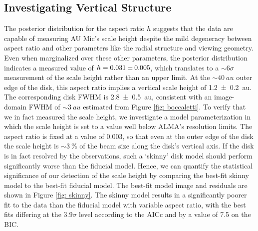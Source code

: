 \documentclass[modern]{aastex62}
\begin{document}
\subsection{Investigating Vertical Structure}
\label{subsection: vertical analysis}

The posterior distribution for the aspect ratio $h$ suggests that the data are capable of measuring AU Mic's scale height despite the mild degeneracy between aspect ratio and other parameters like the radial structure and viewing geometry.  
Even when marginalized over these other parameters, the posterior distribution indicates a measured value of $h=\num{0.031 \pm 0.005}$, which translates to a $\sim 6 \sigma$ measurement of the scale height rather than an upper limit.
At the $\sim \SI{40}{au}$ outer edge of the disk, this aspect ratio implies a vertical scale height of \SI{1.2 \pm 0.2}{au}. 
The corresponding disk FWHM is \SI{2.8 \pm 0.5}{au}, consistent with an image-domain FWHM of $\sim \SI{3}{au}$ estimated from Figure \ref{fig: boccaletti}.
To verify that we in fact measured the scale height, we investigate a model parameterization in which the scale height is set to a value well below ALMA's resolution limits.
The aspect ratio is fixed at a value of $0.003$, so that even at the outer edge of the disk the scale height is $\sim \SI{3}{\percent}$ of the beam size along the disk's vertical axis.
If the disk is in fact resolved by the observations, such a `skinny' disk model should perform significantly worse than the fiducial model.
Hence, we can quantify the statistical significance of our detection of the scale height by comparing the best-fit skinny model to the best-fit fiducial model.
The best-fit model image and residuals are shown in Figure \ref{fig: skinny}.
The skinny model results in a significantly poorer fit to the data than the fiducial model with variable aspect ratio, with the best fits differing at the $3.9 \sigma$ level according to the AICc and by a value of 7.5 on the BIC.
\end{document}

